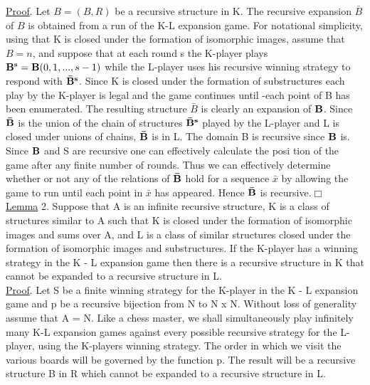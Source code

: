 \documentclass[twoside]{article}
\begin{document}
\newline
\underline{Proof}.     Let $B = (B,R)$ be a recursive structure in   K.   The recursive expansion   $\bar{B}$ of $B$ is obtained from a run of the K-L expansion game. 
For notational simplicity, using that K is closed under the formation of isomorphic images, assume that   $B = n$, and suppose that at each round   s   the K-player plays   $\mathbf{B^s} = \mathbf{B}(0,1,...,s-1)$   while the   L-player uses his recursive winning strategy to respond with  $\mathbf{\bar{B}^s}$.   
Since   K   is closed under the formation of substructures each play by the   K-player is legal and the game continues until -each point of   B   has been enumerated.   
The resulting structure   $\bar{B}$   is clearly
\newpage
%
%
an expansion of $\mathbf{B}$. 
Since $\mathbf{\bar{B}}$ is the union of the chain of structures $\mathbf{\bar{B}^s}$ played by the L-player and L is closed under unions of chains, $\mathbf{\bar{B}}$ is in L. 
The domain B is recursive since $\mathbf{B}$ is. 
Since $\mathbf{B}$ and S are recursive one can effectively calculate the posi tion of the game after any finite number of rounds. Thus we can effectively determine whether or not any of the relations of $\mathbf{\bar{B}}$ hold for a sequence $\bar{x}$ by allowing the game to run until each point in $\bar{x}$   has appeared.    
Hence   $\mathbf{\bar{B}}$  is recursive.$\Box$\\
\newline
\underline{Lemma} 2.    Suppose that A   is an infinite recursive structure, K   is a class of structures similar to   A   such that   K   is closed under the formation of isomorphic images and sums over A, and   L   is a class of similar structures closed under the formation of isomorphic images and substructures.
If the K-player has a winning strategy in the   K - L   expansion game then there is a recursive structure in   K   that cannot be expanded to a recursive structure in L.\\
\newline
\underline{Proof}.    Let   S   be a finite winning strategy for the   K-player in the   K - L expansion game and   p   be a recursive bijection from N   to N x N. Without loss of generality assume that   A =   N.    
Like a chess master, we shall simultaneously play infinitely many K-L expansion games against every possible recursive strategy for the L-player, using the K-players winning strategy. 
The order in which we visit the various boards will be governed by the function p. The result will be a recursive structure B in R which cannot be expanded to a recursive structure in L.
\end{document}
